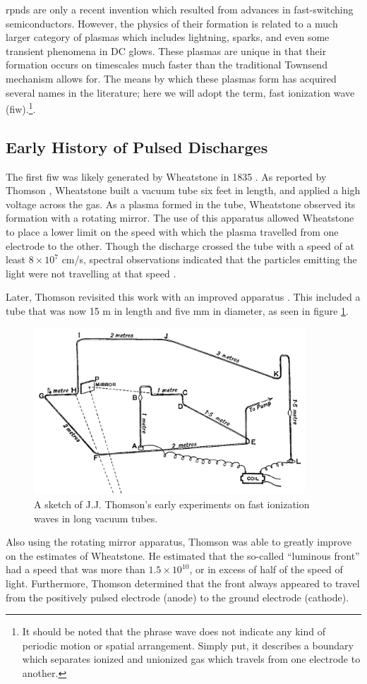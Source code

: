 \acs{rpnd}s are only a recent invention which resulted from advances in
fast-switching semiconductors. However, the physics of their formation is
related to a much larger category of plasmas which includes lightning, sparks,
and even some transient phenomena in DC glows. These plasmas are unique in that
their formation occurs on timescales much faster than the traditional Townsend
mechanism allows for. The means by which these plasmas form has acquired several
names in the literature; here we will adopt the term, fast ionization wave
(\acs{fiw}).\footnote{It should be noted that the phrase wave does not indicate
any kind of periodic motion or spatial arrangement. Simply put, it describes a
boundary which separates ionized and unionized gas which travels from one
electrode to another.}.

\subsection{Early History of Pulsed Discharges}

The first \acs{fiw} was likely generated by Wheatstone in 1835
\cite{Wheatstone1835}. As reported by Thomson \cite{Thomson1893}, Wheatstone
built a vacuum tube six feet in length, and applied a high voltage across the
gas. As a plasma formed in the tube, Wheatstone observed its formation with a
rotating mirror. The use of this apparatus allowed Wheatstone to place a lower
limit on the speed with which the plasma travelled from one electrode to the
other. Though the discharge crossed the tube with a speed of at least
$8\times10^7$ cm/s, spectral observations indicated that the particles emitting
the light were not travelling at that speed \cite{Zahn1879}.

Later, Thomson revisited this work with an improved apparatus
\cite{Thomson1893}. This included a tube that was now 15 m in length and five mm
in diameter, as seen in figure \ref{fig:thomson}.
\begin{figure}
  \centering
  \includegraphics[width=4in]{chapters/introduction/figures/thomson.png}
  \caption{A sketch of J.J. Thomson's early experiments on fast ionization
  waves in long vacuum tubes.}\label{fig:thomson}
\end{figure}
Also using the rotating mirror apparatus, Thomson was able to greatly improve on
the estimates of Wheatstone. He estimated that the so-called ``luminous front''
had a speed that was more than $1.5\times10^{10}$, or in excess of half of the
speed of light. Furthermore, Thomson determined that the front always appeared
to travel from the positively pulsed electrode (anode) to the ground electrode
(cathode).

